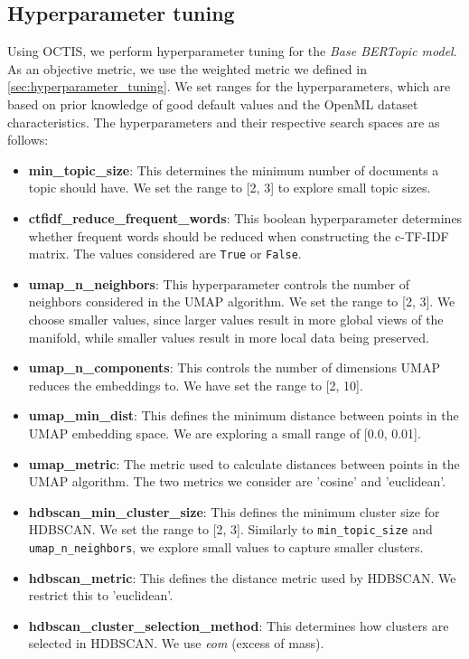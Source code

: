 \subsection{Hyperparameter tuning}
Using OCTIS, we perform hyperparameter tuning for the \textit{Base BERTopic model}. As an objective metric, we use the weighted metric we defined in \cref{sec:hyperparameter_tuning}. We set ranges for the hyperparameters, which are based on prior knowledge of good default values and the OpenML dataset characteristics. The hyperparameters and their respective search spaces are as follows:

\begin{itemize}
    \item \textbf{min\_topic\_size}: This determines the minimum number of documents a topic should have. We set the range to [2, 3] to explore small topic sizes.
    \item \textbf{ctfidf\_reduce\_frequent\_words}: This boolean hyperparameter determines whether frequent words should be reduced when constructing the c-TF-IDF matrix. The values considered are \texttt{True} or \texttt{False}.
    \item \textbf{umap\_n\_neighbors}: This hyperparameter controls the number of neighbors considered in the UMAP algorithm. We set the range to [2, 3]. We choose smaller values, since larger values result in more global views of the manifold, while smaller values result in more local data being preserved.
    \item \textbf{umap\_n\_components}: This controls the number of dimensions UMAP reduces the embeddings to. We have set the range to [2, 10].
    \item \textbf{umap\_min\_dist}: This defines the minimum distance between points in the UMAP embedding space. We are exploring a small range of [0.0, 0.01].
    \item \textbf{umap\_metric}: The metric used to calculate distances between points in the UMAP algorithm. The two metrics we consider are 'cosine' and 'euclidean'.
    \item \textbf{hdbscan\_min\_cluster\_size}: This defines the minimum cluster size for HDBSCAN. We set the range to [2, 3]. Similarly to \texttt{min\_topic\_size} and \texttt{umap\_n\_neighbors}, we explore small values to capture smaller clusters.
    \item \textbf{hdbscan\_metric}: This defines the distance metric used by HDBSCAN. We restrict this to 'euclidean'.
    \item \textbf{hdbscan\_cluster\_selection\_method}: This determines how clusters are selected in HDBSCAN. We use \textit{eom} (excess of mass).

\end{itemize}

